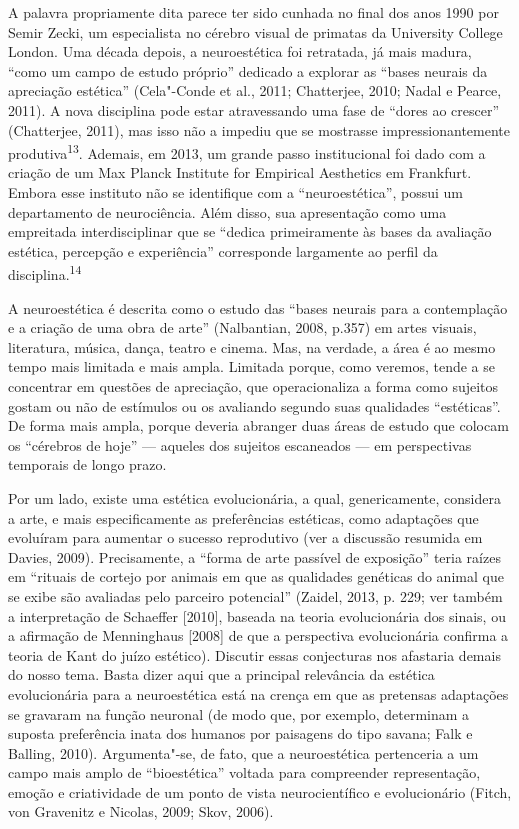 A palavra propriamente dita parece ter sido cunhada no final dos anos
1990 por Semir Zecki, um especialista no cérebro visual de primatas da
University College London. Uma década depois, a neuroestética foi
retratada, já mais madura, ``como um campo de estudo próprio'' dedicado
a explorar as ``bases neurais da apreciação estética'' (Cela"-Conde et
al., 2011; Chatterjee, 2010; Nadal e Pearce, 2011). A nova disciplina
pode estar atravessando uma fase de ``dores ao crescer'' (Chatterjee,
2011), mas isso não a impediu que se mostrasse impressionantemente
produtiva\textsuperscript{13}. Ademais, em 2013, um grande passo
institucional foi dado com a criação de um Max Planck Institute for
Empirical Aesthetics em Frankfurt. Embora esse instituto não se
identifique com a ``neuroestética'', possui um departamento de
neurociência. Além disso, sua apresentação como uma empreitada
interdisciplinar que se ``dedica primeiramente às bases da avaliação
estética, percepção e experiência'' corresponde largamente ao perfil da
disciplina.\textsuperscript{14}

A neuroestética é descrita como o estudo das ``bases neurais para a
contemplação e a criação de uma obra de arte'' (Nalbantian, 2008, p.357)
em artes visuais, literatura, música, dança, teatro e cinema. Mas, na
verdade, a área é ao mesmo tempo mais limitada e mais ampla. Limitada
porque, como veremos, tende a se concentrar em questões de apreciação,
que operacionaliza a forma como sujeitos gostam ou não de estímulos ou
os avaliando segundo suas qualidades ``estéticas''. De forma mais ampla,
porque deveria abranger duas áreas de estudo que colocam os ``cérebros
de hoje'' --- aqueles dos sujeitos escaneados --- em perspectivas
temporais de longo prazo.

Por um lado, existe uma estética evolucionária, a qual, genericamente,
considera a arte, e mais especificamente as preferências estéticas, como
adaptações que evoluíram para aumentar o sucesso reprodutivo (ver a
discussão resumida em Davies, 2009). Precisamente, a ``forma de arte
passível de exposição'' teria raízes em ``rituais de cortejo por animais
em que as qualidades genéticas do animal que se exibe são avaliadas pelo
parceiro potencial'' (Zaidel, 2013, p. 229; ver também a interpretação
de Schaeffer {[}2010{]}, baseada na teoria evolucionária dos sinais, ou
a afirmação de Menninghaus {[}2008{]} de que a perspectiva evolucionária
confirma a teoria de Kant do juízo estético). Discutir essas conjecturas
nos afastaria demais do nosso tema. Basta dizer aqui que a principal
relevância da estética evolucionária para a neuroestética está na crença
em que as pretensas adaptações se gravaram na função neuronal (de modo
que, por exemplo, determinam a suposta preferência inata dos humanos por
paisagens do tipo savana; Falk e Balling, 2010). Argumenta"-se, de fato,
que a neuroestética pertenceria a um campo mais amplo de ``bioestética''
voltada para compreender representação, emoção e criatividade de um
ponto de vista neurocientífico e evolucionário (Fitch, von Gravenitz e
Nicolas, 2009; Skov, 2006).

